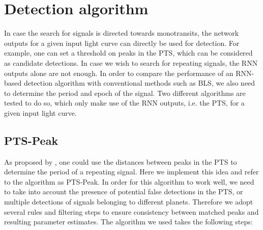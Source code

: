 
\section{Detection algorithm}
\label{sec:algorithm}

In case the search for signals is directed towards monotransits, the network outputs for a given input light curve can directly be used for detection. For example, one can set a threshold on peaks in the PTS, which can be considered as candidate detections. In case we wish to search for repeating signals, the RNN outputs alone are not enough. In order to compare the performance of an RNN-based detection algorithm with conventional methods such as BLS, we also need to determine the period and epoch of the signal. Two different algorithms are tested to do so, which only make use of the RNN outputs, i.e. the PTS, for a given input light curve. 

\subsection{PTS-Peak}
\label{sec:pts-peak}
As proposed by \cite{pearson2018searching}, one could use the distances between peaks in the PTS to determine the period of a repeating signal. Here we implement this idea and refer to the algorithm as PTS-Peak. In order for this algorithm to work well, we need to take into account the presence of potential false detections in the PTS, or multiple detections of signals belonging to different planets. Therefore we adopt several rules and filtering steps to ensure consistency between matched peaks and resulting parameter estimates. The algorithm we used takes the following steps:


